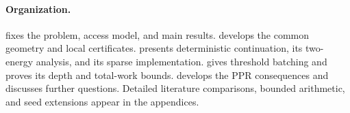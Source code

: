 \paragraph{Organization.}
 fixes the problem, access model, and main
results.  develops the common geometry and
local certificates.  presents deterministic
continuation, its two-energy analysis, and its sparse implementation.
 gives threshold batching and proves its depth
and total-work bounds.  develops the PPR consequences
and discusses further questions. Detailed literature comparisons, bounded
arithmetic, and seed extensions appear in the appendices.
